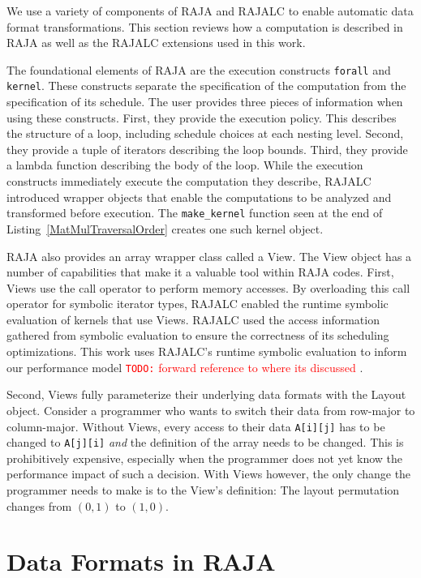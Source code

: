 \documentclass[sigconf, table]{acmart}
\newcommand{\todo}[1]{{\textcolor{red}{{\tt{TODO:}}\,\,#1 }}}
\begin{document}
We use a variety of components of RAJA and RAJALC to enable automatic data format transformations. This section reviews how a computation is described in RAJA as well as the RAJALC extensions used in this work. 

The foundational elements of RAJA are the execution constructs \verb.forall. and \verb.kernel.. 
These constructs separate the specification of the computation from the specification of its schedule. 
The user provides three pieces of information when using these constructs. 
First, they provide the execution policy. 
This describes the structure of a loop, including schedule choices at each nesting level. 
Second, they provide a tuple of iterators describing the loop bounds. 
Third, they provide a lambda function describing the body of the loop.
While the execution constructs immediately execute the computation they describe, RAJALC introduced wrapper objects that enable the computations to be analyzed and transformed before execution. 
The \verb.make_kernel. function seen at the end of Listing~\ref{MatMulTraversalOrder} creates one such kernel object.

RAJA also provides an array wrapper class called a View.
The View object has a number of capabilities that make it a valuable tool within RAJA codes.
First, Views use the call operator to perform memory accesses. 
By overloading this call operator for symbolic iterator types, RAJALC enabled the runtime symbolic evaluation of kernels that use Views.
RAJALC used the access information gathered from symbolic evaluation to ensure the correctness of its scheduling optimizations.
This work uses RAJALC's runtime symbolic evaluation to inform our performance model \todo{forward reference to where its discussed}.

Second, Views fully parameterize their underlying data formats with the Layout object.
Consider a programmer who wants to switch their data from row-major to column-major. 
Without Views, every access to their data \verb.A[i][j]. has to be changed to \verb.A[j][i]. \textit{and} the definition of the array needs to be changed. 
This is prohibitively expensive, especially when the programmer does not yet know the performance impact of such a decision.
With Views however, the only change the programmer needs to make is to the View's definition: The layout permutation changes from $(0,1)$ to $(1,0)$.


\section{Data Formats in RAJA}
\end{document}
